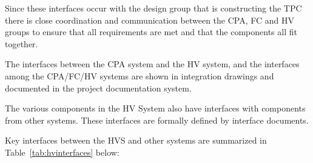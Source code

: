 Since these interfaces occur with the design group that is constructing the TPC there is close coordination and communication between the CPA, FC and HV groups to ensure that all requirements are met and that the components all fit together.  

The interfaces between the CPA system and the HV system, and the interfaces among the CPA/FC/HV systems are shown in integration drawings and documented in the project documentation system.


The various components in the HV System also have interfaces with components from other systems.  These interfaces are formally defined by interface documents. 
 
Key interfaces between the HVS and other systems are summarized in Table~{\ref{tab:hvinterfaces}} below:






